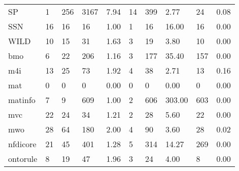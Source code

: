 \begin{tabular}{llllllllll}
SP                          &                          1 &                        256 &            3167 &           7.94 &             14 &               399 &             2.77 &               24 &         0.08 \\
SSN                         &                         16 &                         16 &              16 &           1.00 &              1 &                16 &            16.00 &               16 &         0.00 \\
WILD                        &                         10 &                         15 &              31 &           1.63 &              3 &                19 &             3.80 &               10 &         0.00 \\
bmo                         &                          6 &                         22 &             206 &           1.16 &              3 &               177 &            35.40 &              157 &         0.00 \\
m4i                         &                         13 &                         25 &              73 &           1.92 &              4 &                38 &             2.71 &               13 &         0.16 \\
mat                         &                          0 &                          0 &               0 &           0.00 &              0 &                 0 &             0.00 &                0 &         0.00 \\
matinfo                     &                          7 &                          9 &             609 &           1.00 &              2 &               606 &           303.00 &              603 &         0.00 \\
mvc                         &                         22 &                         24 &              34 &           1.21 &              2 &                28 &             5.60 &               22 &         0.00 \\
mwo                         &                         28 &                         64 &             180 &           2.00 &              4 &                90 &             3.60 &               28 &         0.02 \\
nfdicore                    &                         21 &                         45 &             401 &           1.28 &              5 &               314 &            14.27 &              269 &         0.00 \\
ontorule                    &                          8 &                         19 &              47 &           1.96 &              3 &                24 &             4.00 &                8 &         0.00 \\

\end{tabular}
